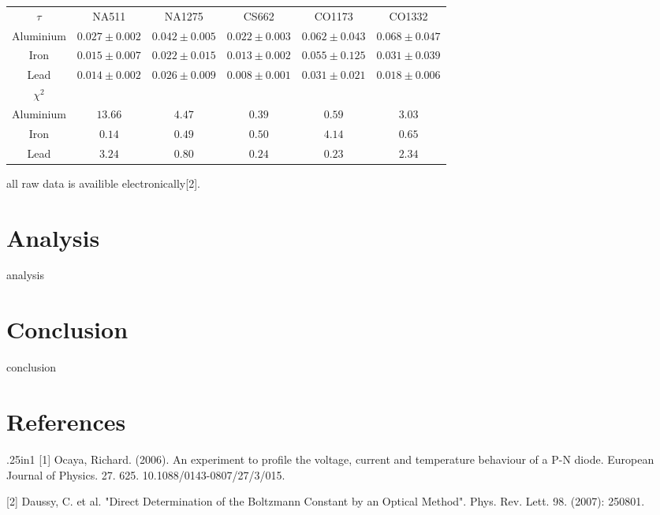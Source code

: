 \documentclass[12pt, a4paper]{article}
\begin{document}
	\small{
		\begin{center}
			\begin{tabular}{ ||c|c|c|c|c|c|| }
				$\tau$ & NA511 & NA1275 & CS662 & CO1173 & CO1332\\ 
				Aluminium & $0.027\pm0.002$ & $0.042\pm0.005$ & $0.022\pm0.003$ & $0.062\pm0.043$ & $0.068\pm0.047$\\
				Iron & $0.015\pm0.007$ & $0.022\pm0.015$ & $0.013\pm0.002$ & $0.055\pm0.125$ & $0.031\pm0.039$\\
				Lead & $0.014\pm0.002$ & $0.026\pm0.009$ & $0.008\pm0.001$ & $0.031\pm0.021$ & $0.018\pm0.006$\\
				$\chi^2$ & & & & & \\ 
				Aluminium & $13.66$ & $4.47$ & $0.39$ & $0.59$ & $3.03$\\
				Iron & $0.14$ & $0.49$ & $0.50$ & $4.14$ & $0.65$\\
				Lead & $3.24$ & $0.80$ & $0.24$ & $0.23$ & $2.34$\\
			\end{tabular}
		\end{center}
	}

	all raw data is availible electronically[2].

\section{Analysis}
	analysis

\section{Conclusion}
	conclusion

\section*{References}

	\begin{hangparas}{.25in}{1}
		[1] Ocaya, Richard. (2006). An experiment to profile the voltage, current and temperature behaviour of a P-N diode. European Journal of Physics. 27. 625. 10.1088/0143-0807/27/3/015.
		
		[2] Daussy, C. et al. "Direct Determination of the Boltzmann Constant by an Optical Method". Phys. Rev. Lett. 98. (2007): 250801.
	\end{hangparas}
\end{document}
